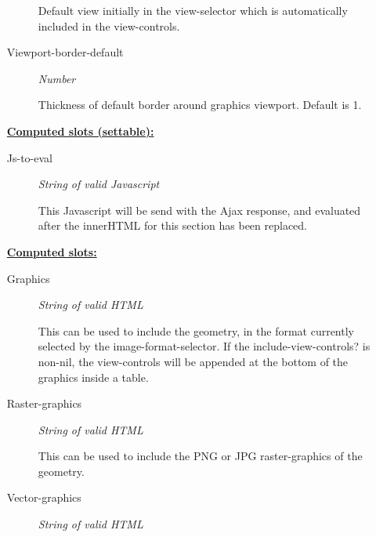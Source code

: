 \documentclass [11pt]{book}
\begin{document}
\begin{itemize}
\begin{description}
Default view initially in the view-selector which is
automatically included in the view-controls.




\item [Viewport-border-default]
\emph{Number}

 Thickness of default border around graphics viewport.
Default is 1.




\end{description}






\textbf{
\underline{Computed slots (settable):}}

\begin{description}

\item [Js-to-eval]
\emph{String of valid Javascript}

 This Javascript will be send with the Ajax response,
and evaluated after the innerHTML for this section has been replaced.




\end{description}






\textbf{
\underline{Computed slots:}}

\begin{description}

\item [Graphics]
\emph{String of valid HTML}

 This can be used to
include the geometry, in the format currently selected by the image-format-selector.
If the include-view-controls? is non-nil, the view-controls will be appended at the
bottom of the graphics inside a table.




\item [Raster-graphics]
\emph{String of valid HTML}

 This can be used to
include the PNG or JPG raster-graphics of the geometry.




\item [Vector-graphics]
\emph{String of valid HTML}


\end{description}
\end{itemize}
\end{document}
